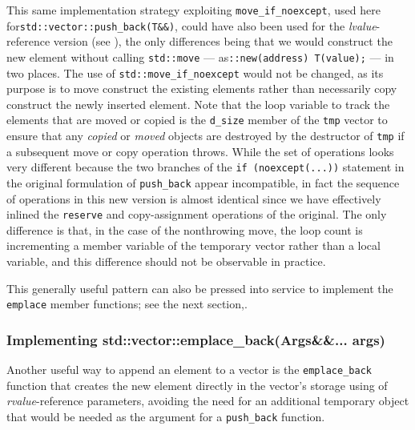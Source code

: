 This same implementation strategy exploiting
\lstinline!move_if_noexcept!, used here for\linebreak[4]
\lstinline!std::vector::push_back(T&&)!, could have also been used for
the \emph{lvalue}-reference version (see ), the only
differences being that we would construct the new element without
calling \lstinline!std::move! --- as\linebreak[4]
\lstinline!::new(address)!~\lstinline!T(value);! --- in two places. The use of
\lstinline!std::move_if_noexcept! would not be changed, as its purpose is
to move construct the existing elements rather than necessarily copy
construct the newly inserted element. Note that the loop variable to
track the elements that are moved or copied is the \lstinline!d_size!
member of the \lstinline!tmp! vector to ensure that any \emph{copied} or
\emph{moved} objects are destroyed by the destructor of \lstinline!tmp! if
a subsequent move or copy operation throws. While the set of operations
looks very different because the two branches of the
\lstinline!if!~\lstinline!(noexcept(...))! statement in the original
formulation of \lstinline!push_back! appear incompatible, in fact the
sequence of operations in this new version is almost identical since we
have effectively inlined the \lstinline!reserve! and copy-assignment
operations of the original. The only difference is that, in the case of
the nonthrowing move, the loop count is incrementing a member variable
of the temporary vector rather than a local variable, and this
difference should not be observable in practice.

This generally useful pattern can also be pressed into service to
implement the \lstinline!emplace! member functions; see the next section,\linebreak[4]
.

\subsubsection[Implementing \lstinline!std::vector::emplace_back(Args&&... args)!]{Implementing {\SubsubsecCode std::vector::emplace\_back(Args\&\&... args)}}\label{implementing-std::vector::emplace_back(args&&...-args)}

Another useful way to append an element to a vector is the
\lstinline!emplace_back! function that creates the new element directly in
the vector's storage using  of
\emph{rvalue}-reference parameters, avoiding the need for an additional
temporary object that would be needed as the argument for a
\lstinline!push_back! function.

